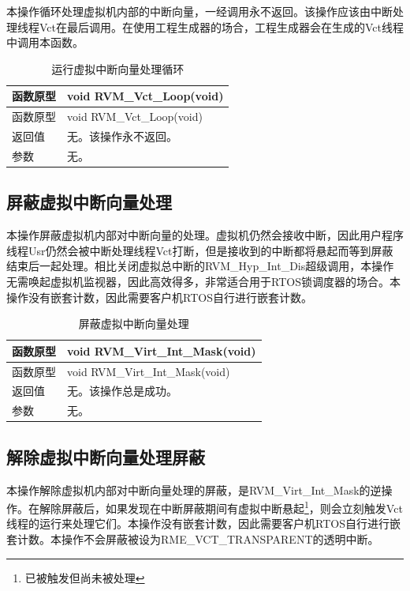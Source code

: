 本操作循环处理虚拟机内部的中断向量，一经调用永不返回。该操作应该由中断处理线程Vct在最后调用。在使用工程生成器的场合，工程生成器会在生成的Vct线程中调用本函数。

\begin{xltabular}{\textwidth}{@{}>{\hsize\raggedright\arraybackslash}X>{\hsize\raggedright\arraybackslash}X@{}}
\caption{运行虚拟中断向量处理循环}\label{tab:4-20}\\
\toprule
函数原型 & void RVM\_\allowbreak{}Vct\_\allowbreak{}Loop(void)\tabularnewline
\endfirsthead
\toprule
函数原型 & void RVM\_\allowbreak{}Vct\_\allowbreak{}Loop(void)\tabularnewline
\midrule
\endhead
\bottomrule
\endlastfoot
返回值 & 无。该操作永不返回。\tabularnewline
参数 & 无。\tabularnewline
\end{xltabular}

\subsection{屏蔽虚拟中断向量处理}\label{subsec:4-5-3}

本操作屏蔽虚拟机内部对中断向量的处理。虚拟机仍然会接收中断，因此用户程序线程Usr仍然会被中断处理线程Vct打断，但是接收到的中断都将悬起而等到屏蔽结束后一起处理。相比关闭虚拟总中断的RVM\_Hyp\_Int\_Dis超级调用，本操作无需唤起虚拟机监视器，因此高效得多，非常适合用于RTOS锁调度器的场合。本操作没有嵌套计数，因此需要客户机RTOS自行进行嵌套计数。

\begin{xltabular}{\textwidth}{@{}>{\hsize\raggedright\arraybackslash}X>{\hsize\raggedright\arraybackslash}X@{}}
\caption{屏蔽虚拟中断向量处理}\label{tab:4-21}\\
\toprule
函数原型 & void RVM\_\allowbreak{}Virt\_\allowbreak{}Int\_\allowbreak{}Mask(void)\tabularnewline
\endfirsthead
\toprule
函数原型 & void RVM\_\allowbreak{}Virt\_\allowbreak{}Int\_\allowbreak{}Mask(void)\tabularnewline
\midrule
\endhead
\bottomrule
\endlastfoot
返回值 & 无。该操作总是成功。\tabularnewline
参数 & 无。\tabularnewline
\end{xltabular}

\subsection{解除虚拟中断向量处理屏蔽}\label{subsec:4-5-4}

本操作解除虚拟机内部对中断向量处理的屏蔽，是RVM\_Virt\_Int\_Mask的逆操作。在解除屏蔽后，如果发现在中断屏蔽期间有虚拟中断悬起\footnote{已被触发但尚未被处理}，则会立刻触发Vct线程的运行来处理它们。本操作没有嵌套计数，因此需要客户机RTOS自行进行嵌套计数。本操作不会屏蔽被设为RME\_VCT\_TRANSPARENT的透明中断。

